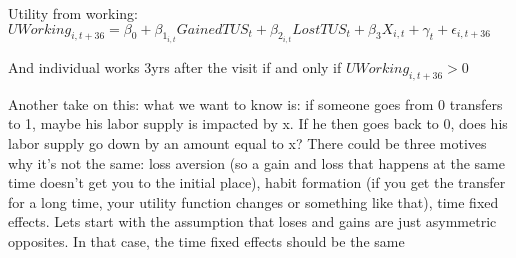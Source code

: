 \documentclass[12pt]{article}
\begin{document}
Utility from working:
$UWorking_{i,t+36} = \beta_0 + \beta_1_{i,t} GainedTUS_t + \beta_2_{i,t} LostTUS_t + \beta_3X_{i,t} + \gamma_t + \epsilon_{i,t+36} $

And individual works 3yrs after the visit if and only if $UWorking_{i,t+36}>0$

Another take on this: what we want to know is: if someone goes from 0 transfers to 1, maybe his labor supply is impacted by x. If he then goes back to 0, does his labor supply go down by an amount equal to x? There could be three motives why it's not the same: loss aversion (so a gain and loss that happens at the same time doesn't get you to the initial place), habit formation (if you get the transfer for a long time, your utility function changes or something like that), time fixed effects. Lets start with the assumption that loses and gains are just asymmetric opposites. In that case, the time fixed effects should be the same



\end{document}
